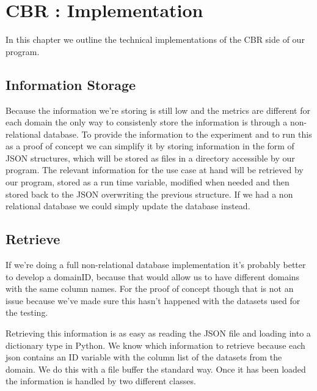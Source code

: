 %
%

\chapter{CBR : Implementation}

\begin{resumen}
In this chapter we outline the technical implementations of the CBR side of our program.
\end{resumen}

\section{Information Storage}
\label{cap1:sec:informationstorage}

Because the information we're storing is still low and the metrics are different for each domain the only way to consistenly store the information is through a non-relational database.
To provide the information to the experiment and to run this as a proof of concept we can simplify it by storing information in the form of JSON structures, which will be stored as files in a directory accessible by our program.
The relevant information for the use case at hand will be retrieved by our program, stored as a run time variable, modified when needed and then stored back to the JSON overwriting the previous structure.
If we had a non relational database we could simply update the database instead.

\section{Retrieve}
\label{cap1:sec:retrieve}

If we're doing a full non-relational database implementation it's probably better to develop a domainID, because that would allow us to have different domains with the same column names.
For the proof of concept though that is not an issue because we've made sure this hasn't happened with the datasets used for the testing.

Retrieving this information is as easy as reading the JSON file and loading into a dictionary type in Python. We know which information to retrieve because each json contains an ID variable with the column list of the datasets from the domain.
We do this with a file buffer the standard way. Once it has been loaded the information is handled by two different classes.

